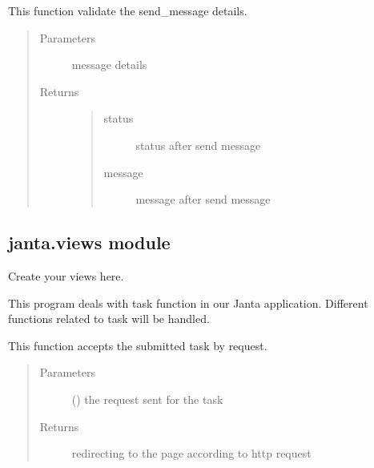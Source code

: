 \documentclass[letterpaper,10pt,english]{sphinxmanual}
\begin{document}
\begin{fulllineitems}
\label{\detokenize{janta:janta.viewhelper.validate_send_message}}
This function validate the send\_message details.
\begin{quote}\begin{description}
\item[{Parameters}] \leavevmode
{} \textendash{} message details

\item[{Returns}] \leavevmode
\begin{quote}\begin{description}
\item[{status}] \leavevmode
status after send message

\item[{message}] \leavevmode
message after send message

\end{description}\end{quote}


\end{description}\end{quote}

\end{fulllineitems}



\subsection{janta.views module}
\label{\detokenize{janta:module-janta.views}}\label{\detokenize{janta:janta-views-module}}
Create your views here.

This program deals with task function in our Janta application. 
Different functions related to task will be handled.

\begin{fulllineitems}
\label{\detokenize{janta:janta.views.accept_submission}}
This function accepts the submitted task by request.
\begin{quote}\begin{description}
\item[{Parameters}] \leavevmode
{} () \textendash{} the request sent for the task

\item[{Returns}] \leavevmode
redirecting to the page according to http request

\end{description}\end{quote}

\end{fulllineitems}
\end{document}
